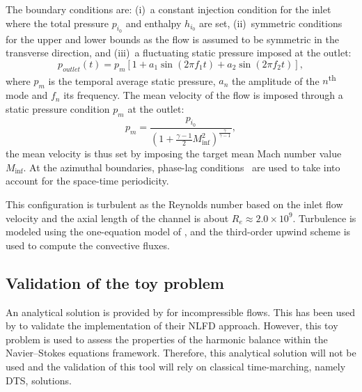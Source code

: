 The boundary conditions are: (i)~a constant injection condition for the inlet
where the total pressure $p_{i_0}$ and enthalpy $h_{i_0}$ are set,
(ii)~symmetric conditions for the upper and lower bounds as the flow
is assumed to be symmetric in the transverse direction, and (iii)~a
fluctuating static pressure imposed at the outlet:
\begin{equation}
  p_{outlet}(t) = p_m \left[1 + a_1 \sin(2 \pi f_1 t) +
    a_2 \sin(2 \pi f_2 t) \right],
  \label{eq:outlet_canal}
\end{equation}
where $p_m$ is the temporal average static pressure, $a_n$ the
amplitude of the $n$\textsuperscript{th} mode and $f_n$ its
frequency.
The mean velocity of the flow is imposed through a
static pressure condition $p_m$ at the outlet:
\begin{equation}
    p_m = \frac{p_{i_0}}{\left(1 + 
    \frac{\gamma - 1}{2} M_{\inf}^2 \right) ^ {\frac{\gamma}{ \gamma - 1}}} ,
\end{equation}
the mean velocity is thus set by imposing the
target mean Mach number value $M_{\inf}$.
At the azimuthal boundaries, phase-lag conditions~\cite{Erdos1977} 
are used to take into account for the space-time periodicity.

This configuration is turbulent as the Reynolds number based on the
inlet flow velocity and the axial length of the channel is about $R_e
\approx 2.0 \times 10^9$.  Turbulence is modeled using the
one-equation model of \citet{Spalart1992}, and the
third-order upwind \citet{Roe1981} scheme is used to compute the
convective fluxes.

\subsection{Validation of the toy problem}
An analytical solution is provided by \citet{Merkle1987} for
incompressible flows. This has been used by \citet{McMullen2001}
to validate the implementation of their NLFD approach.
However, this toy problem is used
to assess the properties of the harmonic balance within
the Navier--Stokes equations framework. Therefore,
this analytical solution will not be used and the validation of
this tool will rely on classical time-marching, namely DTS, solutions.
